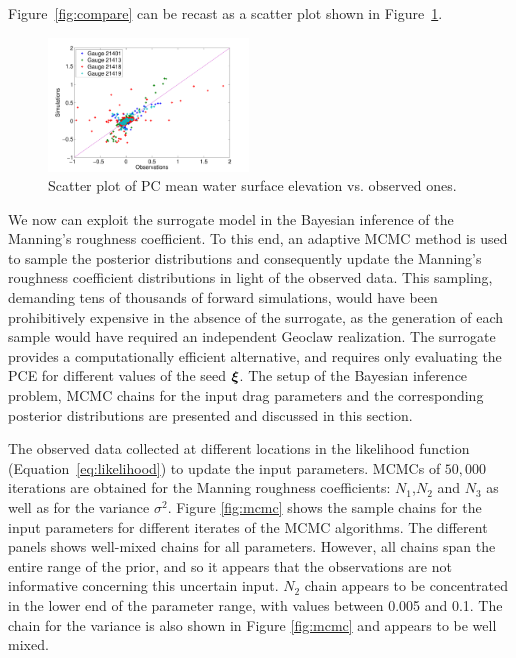 Figure~\ref{fig:compare} can be recast as a scatter plot shown in 
Figure~\ref{fig:scatter}.
\begin{figure}[h]
\centering
\includegraphics[width=0.475\textwidth]{./figures/scatter.pdf} 
\caption{Scatter plot of PC mean water surface elevation vs. observed ones.}
\label{fig:scatter}

\end{figure}        

We now can exploit the surrogate model in the Bayesian inference of the Manning's 
roughness coefficient.  To this end, an adaptive MCMC method is used to sample 
the posterior distributions \citep{Gareth2009,Haario2001} and consequently 
update the Manning's roughness coefficient distributions in light of the 
observed data. This sampling, demanding tens of thousands of forward simulations, 
would have been prohibitively expensive in the
absence of the surrogate, as the generation of each sample would have required an
independent Geoclaw realization. The surrogate provides a computationally
efficient alternative, and requires only evaluating the PCE for different values 
of the seed $\xxi$. The setup of the Bayesian inference problem,
MCMC chains for the input drag parameters and the corresponding posterior distributions are 
presented and discussed in this section. 




The observed data collected at different locations 
in the likelihood function (Equation~\ref{eq:likelihood}) to update the input parameters.
MCMCs of $50,000$ iterations are obtained for the Manning roughness coefficients: 
$N_1$,$N_2$ and $N_3$ as well as for the variance $\sigma^2$. Figure \ref{fig:mcmc} 
shows the sample chains for
the input parameters for different iterates of the MCMC algorithms. 
The different panels
shows well-mixed chains for all parameters.
However, all chains span the entire range
of the prior, and so it appears that the observations are not informative 
concerning this uncertain input.  $N_{2}$ chain appears to be concentrated in the lower end of the
parameter range, with values between 0.005 and 0.1.
The chain for the variance is also shown in 
Figure \ref{fig:mcmc} and appears to be well mixed.


